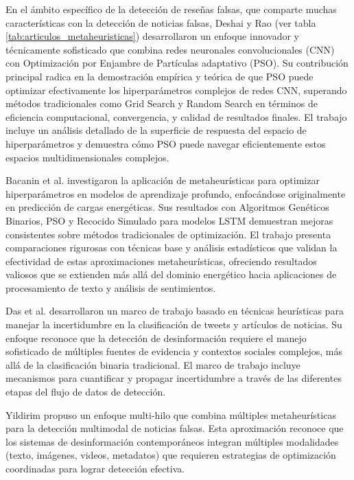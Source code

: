 En el ámbito específico de la detección de reseñas falsas, que comparte muchas características con la detección de noticias falsas, Deshai y Rao \cite{deshai2023unmasking} (ver tabla \ref{tab:articulos_metaheuristicas}) desarrollaron un enfoque innovador y técnicamente sofisticado que combina redes neuronales convolucionales (CNN) con Optimización por Enjambre de Partículas adaptativo (PSO). Su contribución principal radica en la demostración empírica y teórica de que PSO puede optimizar efectivamente los hiperparámetros complejos de redes CNN, superando métodos tradicionales como Grid Search y Random Search en términos de eficiencia computacional, convergencia, y calidad de resultados finales. El trabajo incluye un análisis detallado de la superficie de respuesta del espacio de hiperparámetros y demuestra cómo PSO puede navegar eficientemente estos espacios multidimensionales complejos.

Bacanin et al. \cite{bacanin2023benefits} investigaron la aplicación de metaheurísticas para optimizar hiperparámetros en modelos de aprendizaje profundo, enfocándose originalmente en predicción de cargas energéticas. Sus resultados con Algoritmos Genéticos Binarios, PSO y Recocido Simulado para modelos LSTM demuestran mejoras consistentes sobre métodos tradicionales de optimización. El trabajo presenta comparaciones rigurosas con técnicas base y análisis estadísticos que validan la efectividad de estas aproximaciones metaheurísticas, ofreciendo resultados valiosos que se extienden más allá del dominio energético hacia aplicaciones de procesamiento de texto y análisis de sentimientos.

Das et al. \cite{das2022heuristic} desarrollaron un marco de trabajo basado en técnicas heurísticas para manejar la incertidumbre en la clasificación de tweets y artículos de noticias. Su enfoque reconoce que la detección de desinformación requiere el manejo sofisticado de múltiples fuentes de evidencia y contextos sociales complejos, más allá de la clasificación binaria tradicional. El marco de trabajo incluye mecanismos para cuantificar y propagar incertidumbre a través de las diferentes etapas del flujo de datos de detección.

Yildirim \cite{yildirim2023novel} propuso un enfoque multi-hilo que combina múltiples metaheurísticas para la detección multimodal de noticias falsas. Esta aproximación reconoce que los sistemas de desinformación contemporáneos integran múltiples modalidades (texto, imágenes, videos, metadatos) que requieren estrategias de optimización coordinadas para lograr detección efectiva.

